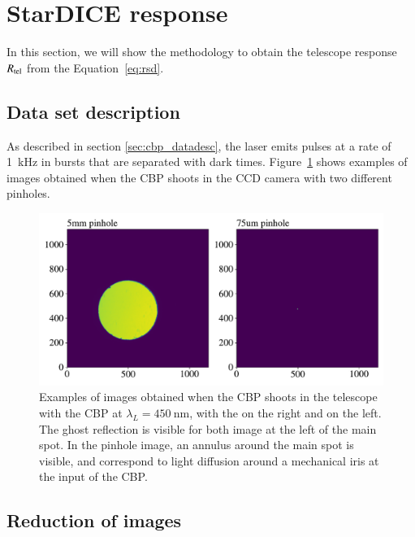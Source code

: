 \section{StarDICE response}
\label{sec:rsd}

In this section, we will show the methodology to obtain the \SD telescope response $R_{\mathrm{tel}}$ from the Equation~\ref{eq:rsd}.

\subsection{Data set description}
\label{sec:sd_datadesc}

As described in section \ref{sec:cbp_datadesc}, the laser emits pulses at a rate of \SI{1}{\kilo\hertz} in bursts that are separated with dark times. Figure~\ref{fig:ccd_examples} shows examples of images obtained when the CBP shoots in the \SD CCD camera with two different pinholes. 

\begin{figure}[h]
    \centering
    \includegraphics[width=\columnwidth]{fig/ccd_examples.pdf}
    \caption{Examples of images obtained when the CBP shoots in the \SD telescope with the CBP at $\lambda_L=\SI{450}{\nm}$, with the \bpinhole on the right and \spinhole on the left. The ghost reflection is visible for both image at the left of the main spot. In the \bpinhole pinhole image, an annulus around the main spot is visible, and correspond to light diffusion around a mechanical iris at the input of the CBP.}
    \label{fig:ccd_examples}
\end{figure}

\subsection{Reduction of images}
\label{sec:photometry}

